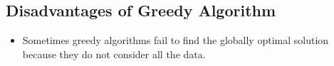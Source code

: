 \documentclass[11pt, twosides]{article}
\begin{document}
\subsection{Disadvantages of Greedy Algorithm}
\begin{itemize}
    \item Sometimes greedy algorithms fail to find the globally optimal solution because they do not consider all the data.
\end{itemize}
\end{document}
